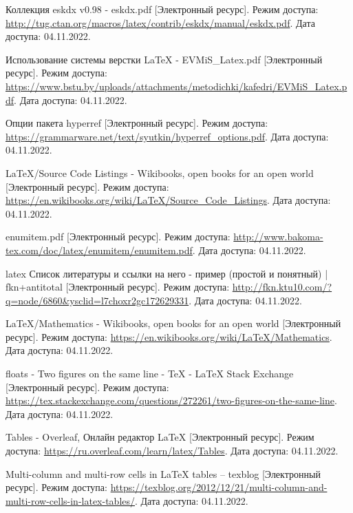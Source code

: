   \begin{thebibliography}{}
    Коллекция eskdx v0.98 - eskdx.pdf
    [Электронный ресурс].
    Режим доступа: \url{http://tug.ctan.org/macros/latex/contrib/eskdx/manual/eskdx.pdf}.
    Дата доступа: 04.11.2022.
  
    Использование системы верстки LaTeX - EVMiS\_Latex.pdf
    [Электронный ресурс].
    Режим доступа: \url{https://www.bstu.by/uploads/attachments/metodichki/kafedri/EVMiS_Latex.pdf}.
    Дата доступа: 04.11.2022.
  
    Опции пакета hyperref
    [Электронный ресурс].
    Режим доступа: \url{https://grammarware.net/text/syutkin/hyperref_options.pdf}.
    Дата доступа: 04.11.2022.
  
    LaTeX/Source Code Listings - Wikibooks, open books for an open world
    [Электронный ресурс].
    Режим доступа: \url{https://en.wikibooks.org/wiki/LaTeX/Source_Code_Listings}.
    Дата доступа: 04.11.2022.
  
    enumitem.pdf
    [Электронный ресурс].
    Режим доступа: \url{http://www.bakoma-tex.com/doc/latex/enumitem/enumitem.pdf}.
    Дата доступа: 04.11.2022.
  
    latex Список литературы и ссылки на него - пример (простой и понятный) | fkn+antitotal
    [Электронный ресурс].
    Режим доступа: \url{http://fkn.ktu10.com/?q=node/6860&ysclid=l7choxr2gc172629331}.
    Дата доступа: 04.11.2022.

    LaTeX/Mathematics - Wikibooks, open books for an open world
    [Электронный ресурс].
    Режим доступа: \url{https://en.wikibooks.org/wiki/LaTeX/Mathematics}.
    Дата доступа: 04.11.2022.

    floats - Two figures on the same line - TeX - LaTeX Stack Exchange
    [Электронный ресурс].
    Режим доступа: \url{https://tex.stackexchange.com/questions/272261/two-figures-on-the-same-line}.
    Дата доступа: 04.11.2022.

    Tables - Overleaf, Онлайн редактор LaTeX
    [Электронный ресурс].
    Режим доступа: \url{https://ru.overleaf.com/learn/latex/Tables}.
    Дата доступа: 04.11.2022.

    Multi-column and multi-row cells in LaTeX tables – texblog
    [Электронный ресурс].
    Режим доступа: \url{https://texblog.org/2012/12/21/multi-column-and-multi-row-cells-in-latex-tables/}.
    Дата доступа: 04.11.2022.   
  \end{thebibliography}
\endgroup

\newpage
